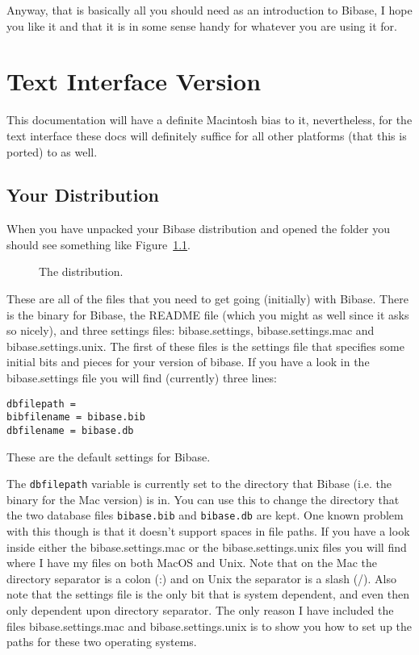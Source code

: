 \documentclass[12pt,a4paper]{book}
\newcommand {\fig}[1] {Figure~\ref{#1}}
\begin{document}
Anyway, that is basically all you should need as an introduction to 
Bibase, I hope you like it and that it is in some sense handy for 
whatever you are using it for.

\chapter{Text Interface Version}

This documentation will have a definite Macintosh bias to it, 
nevertheless, for the text interface these docs will definitely 
suffice for all other platforms (that this is ported) to as well.

\section{Your Distribution}

When you have unpacked your Bibase distribution and opened the folder 
you should see something like \fig{fig:files}.
\begin{figure}[!ht]
\centerline{}
\caption{The distribution.}
\label{fig:files}
\end{figure}
These are all of the files that you need to get going (initially) 
with Bibase.  There is the binary for Bibase, the README file (which 
you might as well since it asks so nicely), and three settings files: 
bibase.settings, bibase.settings.mac and bibase.settings.unix.  The 
first of these files is the settings file that specifies some initial 
bits and pieces for your version of bibase.  If you have a look in 
the bibase.settings file you will find (currently) three lines:
\begin{verbatim}
dbfilepath = 
bibfilename = bibase.bib
dbfilename = bibase.db
\end{verbatim}
These are the default settings for Bibase.  

The {\tt dbfilepath} 
variable is currently set to the directory that Bibase (i.e. the binary 
for the Mac version) is in.  You can use this to change the directory 
that the two database files {\tt bibase.bib} and {\tt bibase.db} are 
kept.  One known problem with this though is that it doesn't support 
spaces in file paths.  If you have a look inside either the 
bibase.settings.mac or the bibase.settings.unix files you will find 
where I have my files on both MacOS and Unix.  Note that on the Mac 
the directory separator is a colon (:) and on Unix the separator is a 
slash (/).  Also note that the settings file is the only bit that is 
system dependent, and even then only dependent upon directory 
separator.  The only reason I have included the files 
bibase.settings.mac and bibase.settings.unix is to show you how to set 
up the paths for these two operating systems.  
\end{document}
